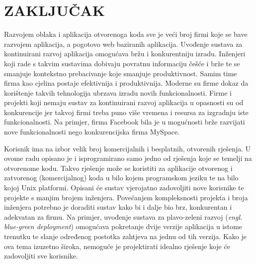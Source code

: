 \chapter{ZAKLJUČAK}
Razvojem oblaka i aplikacija otvorenoga koda sve je veći broj firmi koje se bave razvojem
aplikacija, a pogotovo web baziranih aplikacija. Uvođenje sustava za kontinuirani razvoj aplikacija
omogućava bržu i konkurentniju izradu. Inženjeri koji rade s takvim sustavima dobivaju povratnu
informaciju češće i brže te se smanjuje kontekstno prebacivanje koje smanjuje produktivnost. Samim
time firma kao cjelina postaje efektivnija i produktivnija. Moderne su firme dokaz da korištenje
takvih tehnologija ubrzava izradu novih funkcionalnosti. Firme i projekti koji nemaju sustav za
kontinuirani razvoj aplikacija u opasnosti su od konkurencije jer takvoj firmi treba puno više
vremena i resursa za izgradnju iste funkcionalnosti. Na primjer, firma Facebook bila je u mogućnosti
brže razvijati nove funkcionalnosti nego konkurencijska firma MySpace.

Korisnik ima na izbor velik broj komercijalnih i besplatnih, otvorenih rješenja. U ovome radu
opisano je i isprogramirano samo jedno od rješenja koje se temelji na otvorenome kodu. Takvo
rješenje može se koristiti za aplikacije otvorenog i zatvorenog (komercijalnog) koda u bilo kojem
programskom jeziku te na bilo kojoj Unix platformi. Opisani će sustav vjerojatno zadovoljiti nove
korisnike te projekte s manjim brojem inženjera. Povećanjem kompleksnosti projekta i broja
inženjera potrebno je doraditi sustav kako bi i dalje bio brz, konkurentan i adekvatan za firmu. Na
primjer, uvođenje sustava za plavo-zeleni razvoj (\textit{engl. blue-green deployment}) omogućava
pokretanje dvije verzije aplikacija u istome trenutku te slanje određenog postotka zahtjeva na jednu
od tih verzija.  Kako je ova tema izuzetno široka, nemoguće je projektirati idealno rješenje koje
će zadovoljiti sve korisnike.


